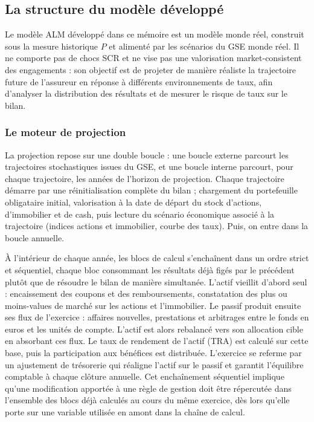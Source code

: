 \subsection{La structure du modèle développé}
\label{sec:structure_alm}

Le modèle ALM développé dans ce mémoire est un modèle monde réel, construit sous la mesure historique $P$ et alimenté par les scénarios du GSE monde réel. Il ne comporte pas de chocs SCR et ne vise pas une valorisation market-consistent des engagements : son objectif est de projeter de manière réaliste la trajectoire future de l'assureur en réponse à différents environnements de taux, afin d'analyser la distribution des résultats et de mesurer le risque de taux sur le bilan.

\subsubsection{Le moteur de projection}

La projection repose sur une double boucle : une boucle externe parcourt les trajectoires stochastiques issues du GSE, et une boucle interne parcourt, pour chaque trajectoire, les années de l'horizon de projection. Chaque trajectoire démarre par une réinitialisation complète du bilan ; chargement du portefeuille obligataire initial, valorisation à la date de départ du stock d'actions, d'immobilier et de cash, puis lecture du scénario économique associé à la trajectoire (indices actions et immobilier, courbe des taux). Puis, on entre dans la boucle annuelle.

À l'intérieur de chaque année, les blocs de calcul s'enchaînent dans un ordre strict et séquentiel, chaque bloc consommant les résultats déjà figés par le précédent plutôt que de résoudre le bilan de manière simultanée. L'actif vieillit d'abord seul : encaissement des coupons et des remboursements, constatation des plus ou moins-values de marché sur les actions et l'immobilier. Le passif produit ensuite ses flux de l'exercice : affaires nouvelles, prestations et arbitrages entre le fonds en euros et les unités de compte. L'actif est alors rebalancé vers son allocation cible en absorbant ces flux. Le taux de rendement de l'actif (TRA) est calculé sur cette base, puis la participation aux bénéfices est distribuée. L'exercice se referme par un ajustement de trésorerie qui réaligne l'actif sur le passif et garantit l'équilibre comptable à chaque clôture annuelle. Cet enchaînement séquentiel implique qu'une modification apportée à une règle de gestion doit être répercutée dans l'ensemble des blocs déjà calculés au cours du même exercice, dès lors qu'elle porte sur une variable utilisée en amont dans la chaîne de calcul.

